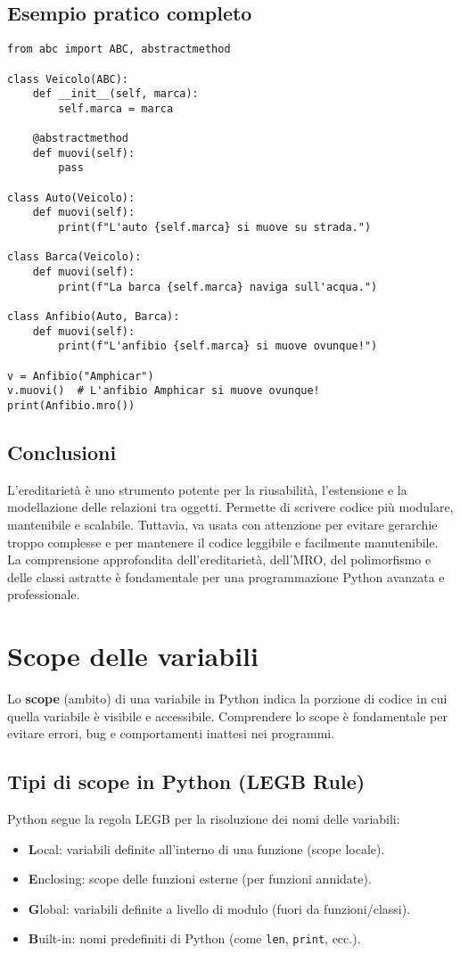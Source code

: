 \documentclass[a4paper,12pt]{article}
\begin{document}
\subsection*{Esempio pratico completo}
\begin{lstlisting}
from abc import ABC, abstractmethod

class Veicolo(ABC):
    def __init__(self, marca):
        self.marca = marca

    @abstractmethod
    def muovi(self):
        pass

class Auto(Veicolo):
    def muovi(self):
        print(f"L'auto {self.marca} si muove su strada.")

class Barca(Veicolo):
    def muovi(self):
        print(f"La barca {self.marca} naviga sull'acqua.")

class Anfibio(Auto, Barca):
    def muovi(self):
        print(f"L'anfibio {self.marca} si muove ovunque!")

v = Anfibio("Amphicar")
v.muovi()  # L'anfibio Amphicar si muove ovunque!
print(Anfibio.mro())
\end{lstlisting}

\subsection*{Conclusioni}
L'ereditarietà è uno strumento potente per la riusabilità, l'estensione e la modellazione delle relazioni tra oggetti. Permette di scrivere codice più modulare, mantenibile e scalabile. Tuttavia, va usata con attenzione per evitare gerarchie troppo complesse e per mantenere il codice leggibile e facilmente manutenibile. La comprensione approfondita dell'ereditarietà, dell'MRO, del polimorfismo e delle classi astratte è fondamentale per una programmazione Python avanzata e professionale.

\section{Scope delle variabili}
Lo \textbf{scope} (ambito) di una variabile in Python indica la porzione di codice in cui quella variabile è visibile e accessibile. Comprendere lo scope è fondamentale per evitare errori, bug e comportamenti inattesi nei programmi.

\subsection*{Tipi di scope in Python (LEGB Rule)}
Python segue la regola LEGB per la risoluzione dei nomi delle variabili:
\begin{itemize}
    \item \textbf{L}ocal: variabili definite all'interno di una funzione (scope locale).
    \item \textbf{E}nclosing: scope delle funzioni esterne (per funzioni annidate).
    \item \textbf{G}lobal: variabili definite a livello di modulo (fuori da funzioni/classi).
    \item \textbf{B}uilt-in: nomi predefiniti di Python (come \texttt{len}, \texttt{print}, ecc.).
\end{itemize}
\end{document}

